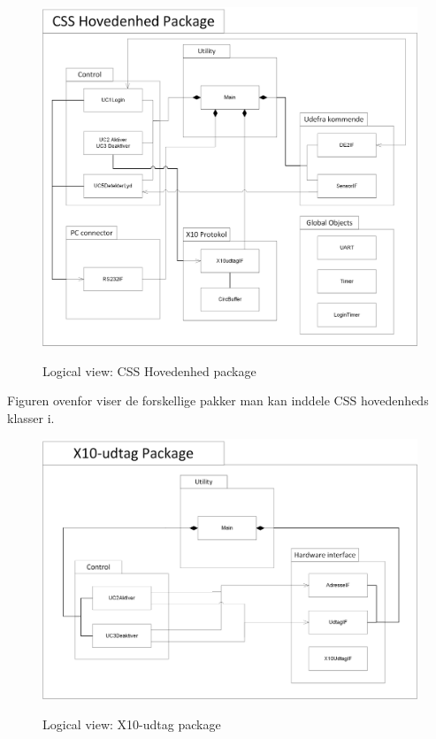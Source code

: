 \begin{figure}[!htb]
     {\includegraphics[width=\textwidth]{billeder/uml/logical_view_CSS_Hovedenhed}}
     \caption{Logical view: CSS Hovedenhed package}
     \label{fig:CSS_Hovedenhed_package}
\end{figure}

Figuren ovenfor viser de forskellige pakker man kan inddele CSS hovedenheds klasser i.

\clearpage

\begin{figure}[!htb]
     {\includegraphics[width=\textwidth]{billeder/uml/logical_view_CSS_Udtag}}
     \caption{Logical view: X10-udtag package}
     \label{fig:CSS_Udtag_package}
\end{figure}


